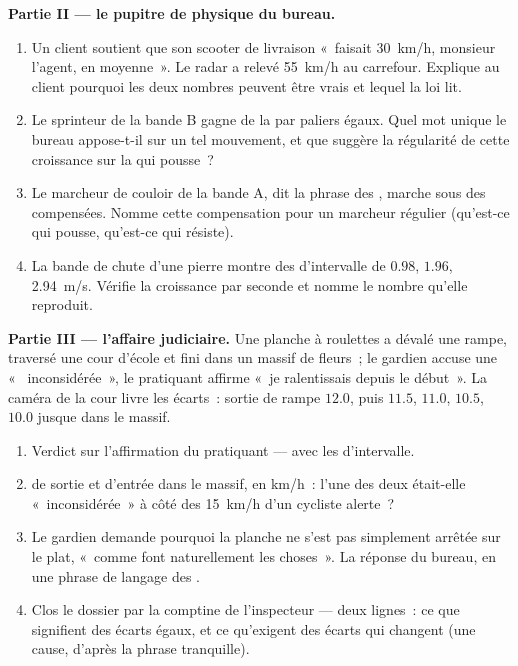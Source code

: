 \begin{problem}
\medskip\noindent\textbf{Partie II --- le pupitre de physique du
bureau.}
\begin{enumerate}[resume]
  \item Un client soutient que son scooter de livraison «~faisait
        \qty{30}{km/h}, monsieur l'agent, en moyenne~». Le radar a
        relevé \qty{55}{km/h} au carrefour. Explique au client
        pourquoi les deux nombres peuvent être vrais et lequel la
        loi lit.
  \item Le sprinteur de la bande B gagne de la  par paliers
        égaux. Quel mot unique le bureau appose-t-il sur un tel
        mouvement, et que suggère la régularité de cette croissance
        sur la  qui pousse~?
  \item Le marcheur de couloir de la bande A, dit la phrase des
        , marche sous des  compensées. Nomme cette
        compensation pour un marcheur régulier (qu'est-ce qui
        pousse, qu'est-ce qui résiste).
  \item La bande de chute d'une pierre montre des 
        d'intervalle de $0.98$, $1.96$, \qty{2.94}{m/s}. Vérifie la
        croissance par seconde et nomme le nombre qu'elle
        reproduit.
\end{enumerate}

\medskip\noindent\textbf{Partie III --- l'affaire judiciaire.}
Une planche à roulettes a dévalé une rampe, traversé une cour d'école
et fini dans un massif de fleurs~; le gardien accuse une «~
inconsidérée~», le pratiquant affirme «~je ralentissais depuis le
début~». La caméra de la cour livre les écarts~: sortie de rampe
$12.0$, puis $11.5$, $11.0$, $10.5$, $10.0$ jusque dans le massif.
\begin{enumerate}[resume]
  \item Verdict sur l'affirmation du pratiquant --- avec les
         d'intervalle.
  \item {} de sortie et  d'entrée dans le massif, en
        \unit{km/h}~: l'une des deux était-elle «~inconsidérée~» à
        côté des \qty{15}{km/h} d'un cycliste alerte~?
  \item Le gardien demande pourquoi la planche ne s'est pas
        simplement arrêtée sur le plat, «~comme font naturellement
        les choses~». La réponse du bureau, en une phrase de
        langage des .
  \item Clos le dossier par la comptine de l'inspecteur --- deux
        lignes~: ce que signifient des écarts égaux, et ce
        qu'exigent des écarts qui changent (une cause, d'après la
        phrase tranquille).
\end{enumerate}
\end{problem}

